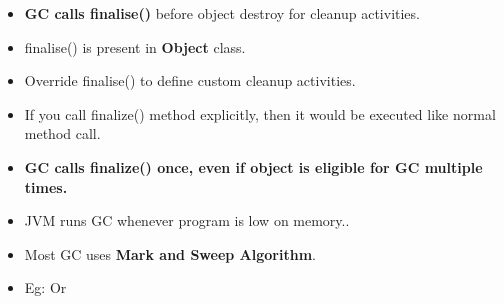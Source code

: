 \setlength{\columnsep}{3pt}
\begin{flushleft}
	
	\begin{itemize}
		\item \textbf{GC calls finalise()} before object destroy for cleanup activities.
		\item finalise() is present in \textbf{Object} class.
		\item Override finalise() to define custom cleanup activities.
		\item If you call finalize() method explicitly, then it would be executed like normal method call.
		\item \textbf{GC calls finalize() once, even if object is eligible for GC multiple times.}
		\item JVM runs GC whenever program is low on memory..
		\item Most GC uses \textbf{Mark and Sweep Algorithm}.
		\newpage
		\item Eg:
		\bigskip
		Or
	\end{itemize}

\end{flushleft}

